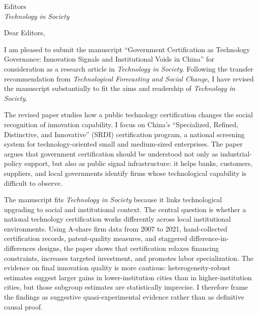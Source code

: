\documentclass[12pt]{letter}
\date{June 9, 2026}
\begin{document}
\begin{letter}{Editors\\\textit{Technology in Society}}

\opening{Dear Editors,}

I am pleased to submit the manuscript ``Government Certification as Technology Governance: Innovation Signals and Institutional Voids in China'' for consideration as a research article in \textit{Technology in Society}. Following the transfer recommendation from \textit{Technological Forecasting and Social Change}, I have revised the manuscript substantially to fit the aims and readership of \textit{Technology in Society}.

The revised paper studies how a public technology certification changes the social recognition of innovation capability. I focus on China's ``Specialized, Refined, Distinctive, and Innovative'' (SRDI) certification program, a national screening system for technology-oriented small and medium-sized enterprises. The paper argues that government certification should be understood not only as industrial-policy support, but also as public signal infrastructure: it helps banks, customers, suppliers, and local governments identify firms whose technological capability is difficult to observe.

The manuscript fits \textit{Technology in Society} because it links technological upgrading to social and institutional context. The central question is whether a national technology certification works differently across local institutional environments. Using A-share firm data from 2007 to 2021, hand-collected certification records, patent-quality measures, and staggered difference-in-differences designs, the paper shows that certification relaxes financing constraints, increases targeted investment, and promotes labor specialization. The evidence on final innovation quality is more cautious: heterogeneity-robust estimates suggest larger gains in lower-institution cities than in higher-institution cities, but those subgroup estimates are statistically imprecise. I therefore frame the findings as suggestive quasi-experimental evidence rather than as definitive causal proof.


\end{letter}
\end{document}
